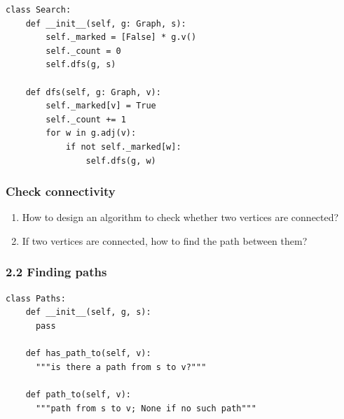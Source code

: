 \documentclass[aspectratio=169, 14pt]{beamer}
\begin{document}
\begin{frame}[fragile]

	\begin{verbatim}
class Search:
    def __init__(self, g: Graph, s):
        self._marked = [False] * g.v()
        self._count = 0
        self.dfs(g, s)

    def dfs(self, g: Graph, v):
        self._marked[v] = True
        self._count += 1
        for w in g.adj(v):
            if not self._marked[w]:
                self.dfs(g, w)
  \end{verbatim}
\end{frame}

\begin{frame}[fragile]
	\frametitle{Check connectivity}
	\begin{enumerate}
		\item How to design an algorithm to check whether two vertices are connected?
		\item If two vertices are connected, how to find the path between them?
	\end{enumerate}
\end{frame}

\begin{frame}[fragile]
	\frametitle{2.2 Finding paths}

	\begin{verbatim}
class Paths:
    def __init__(self, g, s):
      pass

    def has_path_to(self, v):
      """is there a path from s to v?"""

    def path_to(self, v):
      """path from s to v; None if no such path"""
  \end{verbatim}
\end{frame}
\end{document}
